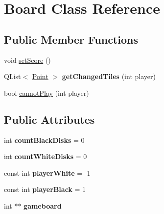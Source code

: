 \hypertarget{classBoard}{\section{Board Class Reference}
\label{classBoard}
}
\subsection*{Public Member Functions}
\begin{DoxyCompactItemize}
\item 
void \hyperlink{classBoard_a3eed410fee6da45f4d3fb1135a9e4027}{set\-Score} ()
\item 
\hypertarget{classBoard_aa7d2779562ddb989cfb2c1c1c0257593}{Q\-List$<$ \hyperlink{classPoint}{Point} $>$ {\bfseries get\-Changed\-Tiles} (int player)}\label{classBoard_aa7d2779562ddb989cfb2c1c1c0257593}

\item 
bool \hyperlink{classBoard_aff66d90b976c5723c4ede10596fd4419}{cannot\-Play} (int player)
\end{DoxyCompactItemize}
\subsection*{Public Attributes}
\begin{DoxyCompactItemize}
\item 
\hypertarget{classBoard_ab2156b9c6303a5de76e3c32ba7ebe912}{int {\bfseries count\-Black\-Disks} = 0}\label{classBoard_ab2156b9c6303a5de76e3c32ba7ebe912}

\item 
\hypertarget{classBoard_a6e92b16b78f29fc7b36752deb79279c0}{int {\bfseries count\-White\-Disks} = 0}\label{classBoard_a6e92b16b78f29fc7b36752deb79279c0}

\item 
\hypertarget{classBoard_acf3d60425df85a154a63313b2fb02cfb}{const int {\bfseries player\-White} = -\/1}\label{classBoard_acf3d60425df85a154a63313b2fb02cfb}

\item 
\hypertarget{classBoard_a44b344204eac8428750e0eefe39683ab}{const int {\bfseries player\-Black} = 1}\label{classBoard_a44b344204eac8428750e0eefe39683ab}

\item 
\hypertarget{classBoard_ac7cdacac815beecce696011f51e45953}{int $\ast$$\ast$ {\bfseries gameboard}}\label{classBoard_ac7cdacac815beecce696011f51e45953}

\end{DoxyCompactItemize}


